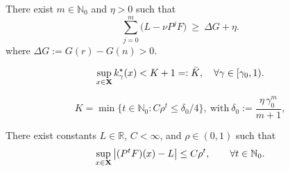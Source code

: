 \documentclass[10pt,a4paper]{amsart}
\begin{document}
\begin{assumption}
\label{ass:TG}
There exist $m\in\mathbb N_0$ and $\eta>0$ such that
\begin{equation}\label{eq:A3_TG}
\sum_{j=0}^{m}\Big(L-\nu P^jF\Big)\ \ge\ \Delta G+\eta.
\end{equation}
where $\Delta G := G(r)-G(n) > 0$.
\end{assumption}

\begin{equation}\label{eq:uniform_bound_conclusion}
\sup_{x\in {\bf X}} {k^\star_\gamma}(x)< {K+1 =: \bar{K}}, \quad {\forall \gamma\in[\gamma_0,1)}.
\end{equation}

\begin{equation}\label{eq:delta0_def}
K=\min\Big\{t\in\mathbb N_0: C\rho^{t}\le \delta_0/4\Big\},
\ \mbox{with} \
\delta_0:=\frac{\eta\,\gamma_0^{m}}{m+1},
\end{equation}

\begin{assumption}
\label{ass:UniGeo}
There exist constants $L\in\mathbb R$, $C<\infty$, and $\rho\in(0,1)$ such that
\begin{equation}
\label{eq:A2_geo}
\sup_{x\in {{\bf X}}}\big|(P^tF)(x)-L\big|\le C\rho^t,\qquad \forall t\in\mathbb N_0.
\end{equation}
\end{assumption}
\end{document}
